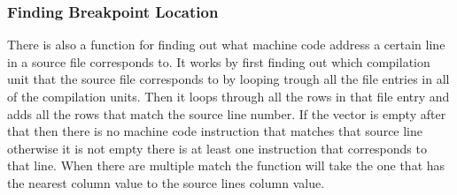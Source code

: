 \subsubsection{Finding Breakpoint Location}
There is also a function for finding out what machine code address a certain line in a source file corresponds to.
It works by first finding out which compilation unit that the source file corresponds to by looping trough all the file entries in all of the compilation units. 
Then it loops through all the rows in that file entry and adds all the rows that match the source line number.
If the vector is empty after that then there is no machine code instruction that matches that source line otherwise it is not empty there is at least one instruction that corresponds to that line.
When there are multiple match the function will take the one that has the nearest column value to the source lines column value.


